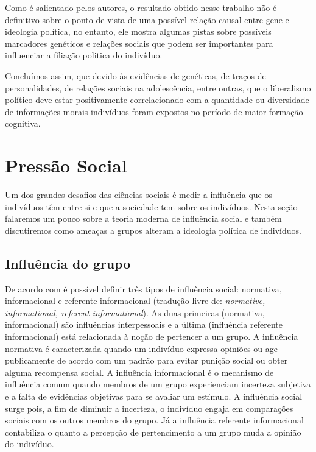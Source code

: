 Como é salientado pelos autores, o resultado obtido nesse trabalho não
é definitivo sobre o  ponto de vista de uma possível relação causal
entre gene e ideologia política, no entanto, ele mostra algumas pistas
sobre possíveis marcadores genéticos e relações sociais que podem ser
importantes para influenciar a filiação politica do indivíduo.

Concluímos assim, que devido às evidências de genéticas, de traços
de personalidades, de relações sociais na adolescência, entre outras,
que o liberalismo político deve estar positivamente correlacionado com a
quantidade ou diversidade de informações morais indivíduos foram expostos
no período de maior formação cognitiva.

\section{Pressão Social} %
\label{sec:pressao}

Um dos grandes desafios das ciências sociais é medir a influência que os 
indivíduos têm entre si e que a sociedade tem sobre os indivíduos. Nesta seção
falaremos um pouco sobre a teoria moderna de influência social e também
discutiremos como ameaças a grupos alteram a ideologia política de indivíduos.

\subsection{Influência do grupo} %
\label{subsec:insoci}

De acordo com  é possível definir três tipos de influência
social: normativa, informacional e referente informacional (tradução livre de:
\textit{normative, informational, referent informational}). As duas primeiras
(normativa, informacional) são influências interpessoais e a última
(influência referente informacional) está relacionada à noção de pertencer
a um grupo.  A influência normativa é caracterizada quando um indivíduo
expressa opiniões ou age publicamente de acordo com um padrão  para evitar
punição social ou obter alguma recompensa social.  A influência informacional é
o mecanismo de influência comum quando membros de um grupo experienciam
incerteza subjetiva e a falta de evidências objetivas para se avaliar um
estímulo. A influência social surge pois, a fim de diminuir a incerteza, o
indivíduo engaja em comparações sociais com os outros membros do grupo. 
Já a influência referente informacional contabiliza o quanto a percepção de
pertencimento a um grupo muda a opinião do indivíduo. 
            
